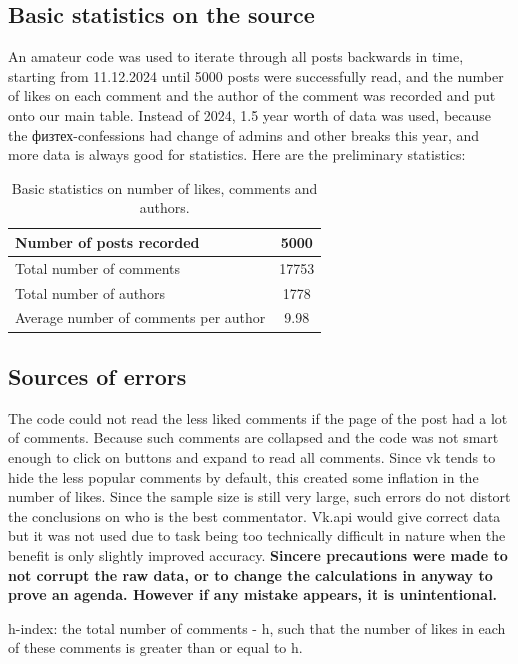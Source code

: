 \documentclass[
	12pt
] {article}
\begin{document}
\subsection{Basic statistics on the source}
	An amateur code \cite{code-scrape-py} was used to iterate through all posts backwards in time, starting from 11.12.2024 until 5000 posts were successfully read, and the number of likes on each comment and the author of the comment was recorded and put onto our main table. Instead of 2024, 1.5 year worth of data was used, because the физтех-confessions had change of admins and other breaks this year, and more data is always good for statistics. Here are the preliminary statistics:

	\begin{table}[H]
		\centering
		\caption{Basic statistics on number of likes, comments and authors.}
		\label{table:basic-stats-number-likes-comments-author}
		\begin{tabular}{| p{5cm}  c |}
			\hline
			Number of posts recorded & 5000 \\
			\hline
			Total number of comments & \num{17753} \\
			Total number of authors & \num{1778} \\
			\hline
			Average number of comments per author & \num{9.98} \\
			\hline
		\end{tabular}
	\end{table}


\subsection{Sources of errors}
	The code could not read the less liked comments if the page of the post had a lot of comments. Because such comments are collapsed and the code was not smart enough to click on buttons and expand to read all comments. Since vk tends to hide the less popular comments by default, this created some inflation in the number of likes. Since the sample size is still very large, such errors do not distort the conclusions on who is the best commentator. Vk.api would give correct data but it was not used due to task being too technically difficult in nature when the benefit is only slightly improved accuracy. \textbf{Sincere precautions were made to not corrupt the raw data, or to change the calculations in anyway to prove an agenda. However if any mistake appears, it is unintentional.}

	h-index: the total number  of comments - h, such that the number of likes in each of these comments is greater than or equal to h.
\end{document}
